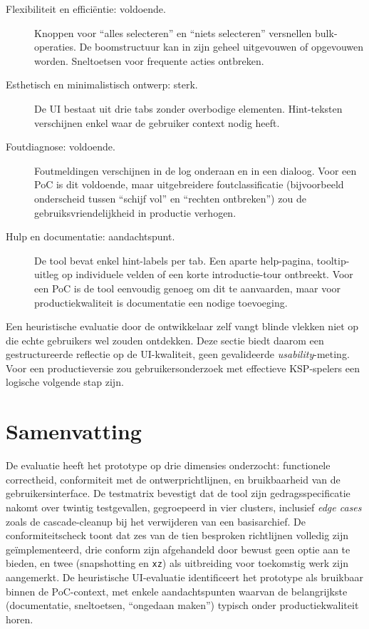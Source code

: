 \begin{description}
    \item[Flexibiliteit en efficiëntie: voldoende.] Knoppen voor ``alles selecteren'' en ``niets selecteren'' versnellen bulk-operaties. De boomstructuur kan in zijn geheel uitgevouwen of opgevouwen worden. Sneltoetsen voor frequente acties ontbreken.
    \item[Esthetisch en minimalistisch ontwerp: sterk.] De UI bestaat uit drie tabs zonder overbodige elementen. Hint-teksten verschijnen enkel waar de gebruiker context nodig heeft.
    \item[Foutdiagnose: voldoende.] Foutmeldingen verschijnen in de log onderaan en in een dialoog. Voor een PoC is dit voldoende, maar uitgebreidere foutclassificatie (bijvoorbeeld onderscheid tussen ``schijf vol'' en ``rechten ontbreken'') zou de gebruiksvriendelijkheid in productie verhogen.
    \item[Hulp en documentatie: aandachtspunt.] De tool bevat enkel hint-labels per tab. Een aparte help-pagina, tooltip-uitleg op individuele velden of een korte introductie-tour ontbreekt. Voor een PoC is de tool eenvoudig genoeg om dit te aanvaarden, maar voor productiekwaliteit is documentatie een nodige toevoeging.
\end{description}

Een heuristische evaluatie door de ontwikkelaar zelf vangt blinde vlekken niet op die echte gebruikers wel zouden ontdekken. Deze sectie biedt daarom een gestructureerde reflectie op de UI-kwaliteit, geen gevalideerde \textit{usability}-meting. Voor een productieversie zou gebruikersonderzoek met effectieve KSP-spelers een logische volgende stap zijn.


\section{Samenvatting}
\label{sec:eval-samenvatting}

De evaluatie heeft het prototype op drie dimensies onderzocht: functionele correctheid, conformiteit met de ontwerprichtlijnen, en bruikbaarheid van de gebruikersinterface. De testmatrix bevestigt dat de tool zijn gedragsspecificatie nakomt over twintig testgevallen, gegroepeerd in vier clusters, inclusief \textit{edge cases} zoals de cascade-cleanup bij het verwijderen van een basisarchief. De conformiteitscheck toont dat zes van de tien besproken richtlijnen volledig zijn geïmplementeerd, drie conform zijn afgehandeld door bewust geen optie aan te bieden, en twee (snapshotting en \texttt{xz}) als uitbreiding voor toekomstig werk zijn aangemerkt. De heuristische UI-evaluatie identificeert het prototype als bruikbaar binnen de PoC-context, met enkele aandachtspunten waarvan de belangrijkste (documentatie, sneltoetsen, ``ongedaan maken'') typisch onder productiekwaliteit horen.

